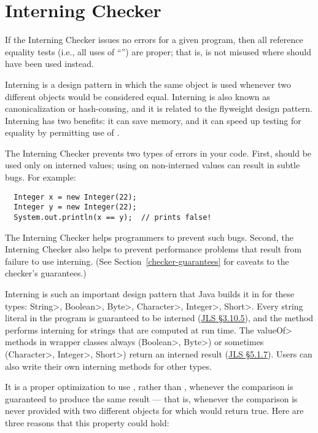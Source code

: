 \htmlhr
\chapter{Interning Checker\label{interning-checker}}

If the Interning Checker issues no errors for a given program, then all
reference equality tests (i.e., all uses of ``\code{==}'') are proper;
that is,
\code{==} is not misused where  should have been used instead.

Interning is a design pattern in which the same object is used whenever two
different objects would be considered equal.  Interning is also known as
canonicalization or hash-consing, and it is related to the flyweight design
pattern.
Interning has two benefits:  it can save memory, and it can speed up testing for
equality by permitting use of \code{==}.

The Interning Checker prevents two types of errors in your code.  First,
\code{==} should be used
only on interned values; using \code{==} on
non-interned values can result in subtle bugs.  For example:

\begin{Verbatim}
  Integer x = new Integer(22);
  Integer y = new Integer(22);
  System.out.println(x == y);  // prints false!
\end{Verbatim}

\noindent
The Interning Checker helps programmers to prevent such bugs.
Second,
the Interning Checker also helps to prevent performance problems that result
from failure to use interning.
(See Section~\ref{checker-guarantees} for caveats to the checker's guarantees.)

Interning is such an important design pattern that Java builds it in for
these types: \<String>, \<Boolean>, \<Byte>, \<Character>, \<Integer>,
\<Short>.  Every string literal in the program is guaranteed to be interned
(\href{https://docs.oracle.com/javase/specs/jls/se10/html/jls-3.html#jls-3.10.5}{JLS
  \S3.10.5}), and the
 method
performs interning for strings that are computed at run time.
The \<valueOf> methods in wrapper classes always (\<Boolean>, \<Byte>) or
sometimes (\<Character>, \<Integer>, \<Short>) return an interned result
(\href{https://docs.oracle.com/javase/specs/jls/se10/html/jls-5.html#jls-5.1.7}{JLS \S5.1.7}).
Users can also write their own interning methods for other types.

It is a proper optimization to use \code{==}, rather than ,
whenever the comparison is guaranteed to produce the same result --- that
is, whenever the comparison is never provided with two different objects
for which  would return true.  Here are three reasons that
this property could hold:

